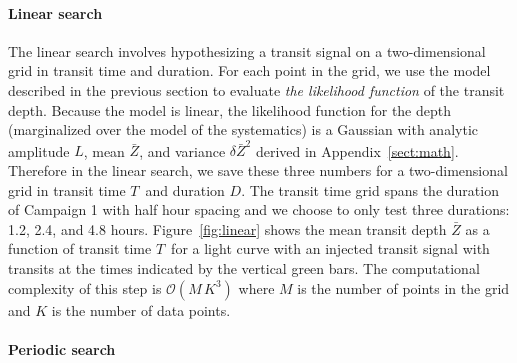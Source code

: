 \documentclass[12pt,preprint]{aastex}
\newcommand{\figref}[1]{\ref{fig:#1}}
\newcommand{\Fig}[1]{Figure~\figref{#1}}
\newcommand{\App}[1]{Appendix~\ref{sect:#1}}
\newcommand{\app}[1]{\App{#1}}
\newcommand{\duration}{{\ensuremath{D}}}
\newcommand{\depth}{{\ensuremath{Z}}}
\newcommand{\transittime}{{\ensuremath{T}}}
\begin{document}
\paragraph{Linear search}

The linear search involves hypothesizing a transit signal on a
two-dimensional grid in transit time and duration.
For each point in the grid, we use the model described in the previous
section to evaluate \emph{the likelihood function} of the transit depth.
Because the model is linear, the likelihood function for the depth
(marginalized over the model of the systematics) is a Gaussian with
analytic amplitude $L$, mean $\bar{\depth}$, and variance
$\delta\bar{\depth}^2$ derived in \app{math}.
Therefore in the linear search, we save these three numbers for a
two-dimensional grid in transit time \transittime\ and duration \duration.
The transit time grid spans the duration of Campaign 1 with half hour spacing
and we choose to only test three durations: 1.2, 2.4, and 4.8 hours.
\Fig{linear} shows the mean transit depth $\bar{\depth}$ as a function of
transit time \transittime\ for a light curve with an injected transit signal
with transits at the times indicated by the vertical green bars.
The computational complexity of this step is $\mathcal{O}(M\,K^3)$ where $M$
is the number of points in the grid and $K$ is the number of data points.


\paragraph{Periodic search}
\end{document}
